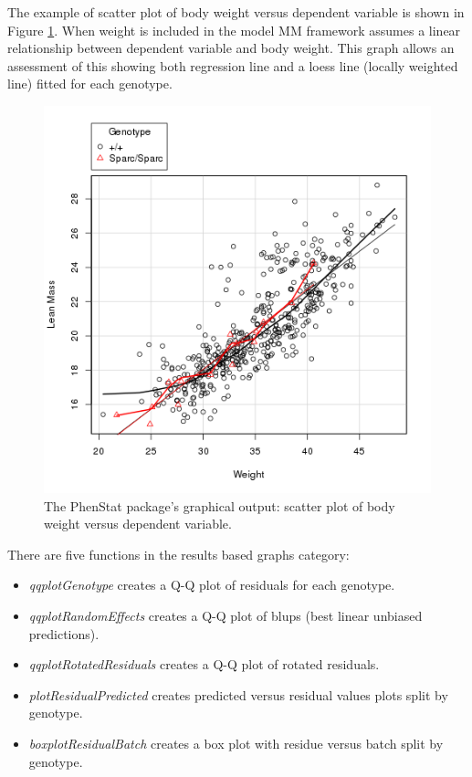 \documentclass[12pt,a4paper]{article}
\begin{document}
The example of scatter plot of body weight versus dependent variable is shown in Figure \ref{fig:08}. When weight is included in the model MM framework assumes a linear relationship between dependent variable and body weight. This graph allows an assessment of this showing both regression line and a loess line (locally weighted line) fitted for each genotype.
\begin{figure}[!htpb]%
\centerline{\includegraphics[scale=0.5]{scatterplotGenotypeWeight.png}}
\caption{The PhenStat package's graphical output: scatter plot of body weight versus dependent variable.}\label{fig:08}
\end{figure}

There are five functions in the results based graphs category:
\begin{itemize}
\item \textit{qqplotGenotype} creates a Q-Q plot of residuals for each genotype.
\item \textit{qqplotRandomEffects} creates a Q-Q plot of blups (best linear unbiased predictions).
\item \textit{qqplotRotatedResiduals} creates a Q-Q plot of rotated residuals.
\item \textit{plotResidualPredicted} creates predicted versus residual values plots split by genotype.
\item \textit{boxplotResidualBatch} creates a box plot with residue versus batch split by genotype.
\end{itemize}
\end{document}
